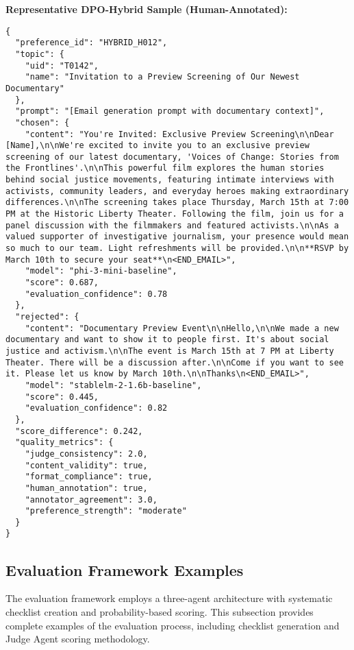 \textbf{Representative DPO-Hybrid Sample (Human-Annotated):}
\begin{verbatim}
{
  "preference_id": "HYBRID_H012",
  "topic": {
    "uid": "T0142",
    "name": "Invitation to a Preview Screening of Our Newest Documentary"
  },
  "prompt": "[Email generation prompt with documentary context]",
  "chosen": {
    "content": "You're Invited: Exclusive Preview Screening\n\nDear [Name],\n\nWe're excited to invite you to an exclusive preview screening of our latest documentary, 'Voices of Change: Stories from the Frontlines'.\n\nThis powerful film explores the human stories behind social justice movements, featuring intimate interviews with activists, community leaders, and everyday heroes making extraordinary differences.\n\nThe screening takes place Thursday, March 15th at 7:00 PM at the Historic Liberty Theater. Following the film, join us for a panel discussion with the filmmakers and featured activists.\n\nAs a valued supporter of investigative journalism, your presence would mean so much to our team. Light refreshments will be provided.\n\n**RSVP by March 10th to secure your seat**\n<END_EMAIL>",
    "model": "phi-3-mini-baseline",
    "score": 0.687,
    "evaluation_confidence": 0.78
  },
  "rejected": {
    "content": "Documentary Preview Event\n\nHello,\n\nWe made a new documentary and want to show it to people first. It's about social justice and activism.\n\nThe event is March 15th at 7 PM at Liberty Theater. There will be a discussion after.\n\nCome if you want to see it. Please let us know by March 10th.\n\nThanks\n<END_EMAIL>",
    "model": "stablelm-2-1.6b-baseline",
    "score": 0.445,
    "evaluation_confidence": 0.82
  },
  "score_difference": 0.242,
  "quality_metrics": {
    "judge_consistency": 2.0,
    "content_validity": true,
    "format_compliance": true,
    "human_annotation": true,
    "annotator_agreement": 3.0,
    "preference_strength": "moderate"
  }
}
\end{verbatim}

\subsection{Evaluation Framework Examples}
\label{subsec:evaluation-framework-examples}

The evaluation framework employs a three-agent architecture with systematic checklist creation and probability-based scoring. This subsection provides complete examples of the evaluation process, including checklist generation and Judge Agent scoring methodology.

